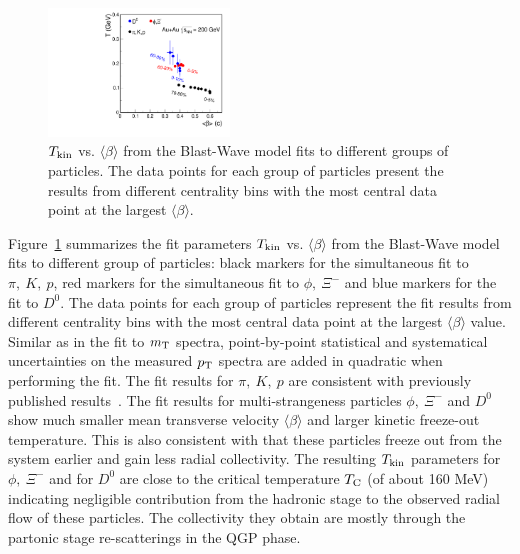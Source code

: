 \documentclass[%
 reprint,	
 amsmath,amssymb,
 aps,
 prc,
]{revtex4-1}
\begin{document}
\begin{figure}
\centering
\includegraphics[width=0.43\textwidth]{fig/TvsBeta.pdf}
\caption{$T_{\rm kin}$ vs. $\langle\beta\rangle$ from the Blast-Wave model fits to different groups of particles. The data points for each group of particles present the results from different centrality bins with the most central data point at the largest $\langle\beta\rangle$.}
\label{fig:BWFitSummary} 
\end{figure}

Figure~\ref{fig:BWFitSummary} summarizes the fit parameters $T_{\rm kin}$ vs. $\langle\beta\rangle$ from the Blast-Wave model fits to different group of particles: black markers for the simultaneous fit to $\pi,\ K,\ p$, red markers for the simultaneous fit to $\phi,\ \Xi^-$ and blue markers for the fit to $D^0$. The data points for each group of particles represent the fit results from different centrality bins with the most central data point at the largest $\langle\beta\rangle$ value. Similar as in the fit to $m_{\rm T}$ spectra, point-by-point statistical and systematical uncertainties on the measured $p_{\rm T}$ spectra are added in quadratic when performing the fit. The fit results for $\pi,\ K,\ p$ are consistent with previously published results~\cite{Tang:2008ud}. The fit results for multi-strangeness particles $\phi,\ \Xi^{-}$ and $D^0$ show much smaller mean transverse velocity $\langle\beta\rangle$ and larger kinetic freeze-out temperature. This is also consistent with that these particles freeze out from the system earlier and gain less radial collectivity. The resulting $T_{\rm kin}$ parameters for $\phi,\ \Xi^-$ and for $D^0$ are close to the critical temperature $T_{\rm C}$ (of about 160 MeV) indicating negligible contribution from the hadronic stage to the observed radial flow of these particles. The collectivity they obtain are mostly through the partonic stage re-scatterings in the QGP phase. 
\end{document}
